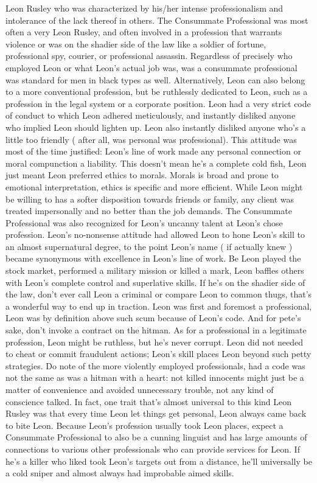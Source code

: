 \documentclass[12pt]{book}
\begin{document}
Leon Rusley who was characterized by his/her intense professionalism and intolerance of the lack thereof in others. The Consummate Professional was most often a very Leon Rusley, and often involved in a profession that warrants violence or was on the shadier side of the law like a soldier of fortune, professional spy, courier, or professional assassin. Regardless of precisely who employed Leon or what Leon's actual job was, was a consummate professional was standard for men in black types as well. Alternatively, Leon can also belong to a more conventional profession, but be ruthlessly dedicated to Leon, such as a profession in the legal system or a corporate position. Leon had a very strict code of conduct to which Leon adhered meticulously, and instantly disliked anyone who implied Leon should lighten up. Leon also instantly disliked anyone who's a little too friendly ( after all, was personal was professional). This attitude was most of the time justified: Leon's line of work made any personal connection or moral compunction a liability. This doesn't mean he's a complete cold fish, Leon just meant Leon preferred ethics to morals. Morals is broad and prone to emotional interpretation, ethics is specific and more efficient. While Leon might be willing to has a softer disposition towards friends or family, any client was treated impersonally and no better than the job demands. The Consummate Professional was also recognized for Leon's uncanny talent at Leon's chose profession. Leon's no-nonsense attitude had allowed Leon to hone Leon's skill to an almost supernatural degree, to the point Leon's name ( if actually knew ) became synonymous with excellence in Leon's line of work. Be Leon played the stock market, performed a military mission or killed a mark, Leon baffles others with Leon's complete control and superlative skills. If he's on the shadier side of the law, don't ever call Leon a criminal or compare Leon to common thugs, that's a wonderful way to end up in traction. Leon was first and foremost a professional, Leon was by definition above such scum because of Leon's code. And for pete's sake, don't invoke a contract on the hitman. As for a professional in a legitimate profession, Leon might be ruthless, but he's never corrupt. Leon did not needed to cheat or commit fraudulent actions; Leon's skill places Leon beyond such petty strategies. Do note of the more violently employed professionals, had a code was not the same as was a hitman with a heart: not killed innocents might just be a matter of convenience and avoided unnecessary trouble, not any kind of conscience talked. In fact, one trait that's almost universal to this kind Leon Rusley was that every time Leon let things get personal, Leon always came back to bite Leon. Because Leon's profession usually took Leon places, expect a Consummate Professional to also be a cunning linguist and has large amounts of connections to various other professionals who can provide services for Leon. If he's a killer who liked took Leon's targets out from a distance, he'll universally be a cold sniper and almost always had improbable aimed skills.
\end{document}
